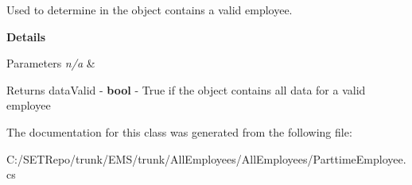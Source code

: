 Used to determine in the object contains a valid employee. 

{\bfseries Details}


\begin{DoxyParams}{Parameters}
{\em n/a} & \\
\hline
\end{DoxyParams}
\begin{DoxyReturn}{Returns}
data\+Valid -\/ {\bfseries bool} -\/ True if the object contains all data for a valid employee 
\end{DoxyReturn}


The documentation for this class was generated from the following file\+:\begin{DoxyCompactItemize}
\item 
C\+:/\+S\+E\+T\+Repo/trunk/\+E\+M\+S/trunk/\+All\+Employees/\+All\+Employees/Parttime\+Employee.\+cs\end{DoxyCompactItemize}

